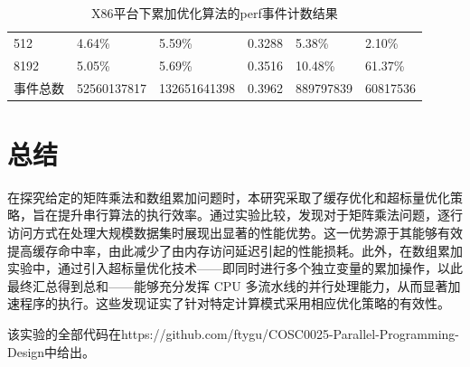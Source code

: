 \documentclass[a4paper]{article}
\begin{document}
\begin{table}[!htbp]
\begin{tabular}{@{}llllll@{}}
         512                           & 4.64\%      & 5.59\%       & 0.3288 & 5.38\%                                                           & 2.10\%                                                           \\
         8192                          & 5.05\%      & 5.69\%       & 0.3516 & 10.48\%                                                          & 61.37\%                                                          \\
         事件总数                          & 52560137817 & 132651641398 & 0.3962 & 889797839                                                        & 60817536                                                                 \\ \bottomrule
         \end{tabular}
         \caption{X86平台下累加优化算法的perf事件计数结果}
         \label{table:perf_X86_sum}
         \end{table}
\newpage
\section{总结}
在探究给定的矩阵乘法和数组累加问题时，本研究采取了缓存优化和超标量优化策略，旨在提升串行算法的执行效率。通过实验比较，发现对于矩阵乘法问题，逐行访问方式在处理大规模数据集时展现出显著的性能优势。这一优势源于其能够有效提高缓存命中率，由此减少了由内存访问延迟引起的性能损耗。此外，在数组累加实验中，通过引入超标量优化技术——即同时进行多个独立变量的累加操作，以此最终汇总得到总和——能够充分发挥 CPU 多流水线的并行处理能力，从而显著加速程序的执行。这些发现证实了针对特定计算模式采用相应优化策略的有效性。

该实验的全部代码在https://github.com/ftygu/COSC0025-Parallel-Programming-Design中给出。
\end{document}

